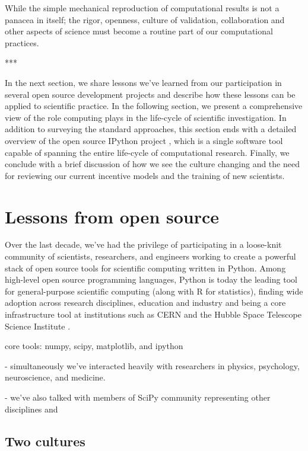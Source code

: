 \documentclass[ChapterTOCs,krantz2]{krantz} %
\newcommand{\parasep}{\begin{center}*\hspace{6em}*\hspace{6em}*\end{center}}
\begin{document}
While the simple mechanical reproduction of computational results is not a
panacea in itself; the rigor, openness, culture of validation, collaboration and
other aspects of science must become a routine part of our computational practices.

\parasep

In the next section, we share lessons we've learned from our participation in
several open source development projects and describe how these lessons can be
applied to scientific practice.  In the following section, we present a
comprehensive view of the role computing plays in the life-cycle of scientific
investigation.  In addition to surveying the standard approaches, this section
ends with a detailed overview of the open source IPython project
\cite{PER-GRA:2007}, which is a single software tool capable of spanning the
entire life-cycle of computational research.  Finally, we conclude with a brief
discussion of how we see the culture changing and the need for reviewing our
current incentive models and the training of new scientists.

\section{Lessons from open source}\label{lessons-oss}

Over the last decade, we've had the privilege of participating in a loose-knit
community of scientists, researchers, and engineers working to create a powerful
stack of open source tools for scientific computing written in Python.  Among
high-level open source programming languages, Python is today the leading tool
for general-purpose scientific computing (along with R for statistics),
finding wide adoption across research disciplines, education and industry and
being a core infrastructure tool at institutions such as CERN and the Hubble
Space Telescope Science Institute
\cite{millman2011python,Perez2011,ganga09,SST}.

core tools: numpy, scipy, matplotlib, and ipython

- simultaneously we've interacted heavily with researchers in
physics, psychology, neuroscience, and medicine.

- we've also talked with members of SciPy community representing
other disciplines and 


\subsection{Two cultures}
\end{document}
